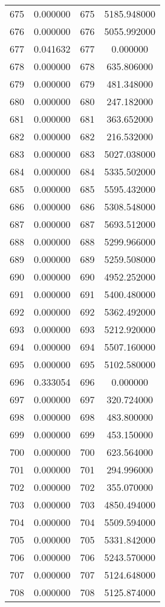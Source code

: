 \documentclass[12pt]{article}
\begin{document}
\begin{longtable}{@{}cccc@{}}
675 & 0.000000 & 675 & 5185.948000 \\
676 & 0.000000 & 676 & 5055.992000 \\
677 & 0.041632 & 677 & 0.000000 \\
678 & 0.000000 & 678 & 635.806000 \\
679 & 0.000000 & 679 & 481.348000 \\
680 & 0.000000 & 680 & 247.182000 \\
681 & 0.000000 & 681 & 363.652000 \\
682 & 0.000000 & 682 & 216.532000 \\
683 & 0.000000 & 683 & 5027.038000 \\
684 & 0.000000 & 684 & 5335.502000 \\
685 & 0.000000 & 685 & 5595.432000 \\
686 & 0.000000 & 686 & 5308.548000 \\
687 & 0.000000 & 687 & 5693.512000 \\
688 & 0.000000 & 688 & 5299.966000 \\
689 & 0.000000 & 689 & 5259.508000 \\
690 & 0.000000 & 690 & 4952.252000 \\
691 & 0.000000 & 691 & 5400.480000 \\
692 & 0.000000 & 692 & 5362.492000 \\
693 & 0.000000 & 693 & 5212.920000 \\
694 & 0.000000 & 694 & 5507.160000 \\
695 & 0.000000 & 695 & 5102.580000 \\
696 & 0.333054 & 696 & 0.000000 \\
697 & 0.000000 & 697 & 320.724000 \\
698 & 0.000000 & 698 & 483.800000 \\
699 & 0.000000 & 699 & 453.150000 \\
700 & 0.000000 & 700 & 623.564000 \\
701 & 0.000000 & 701 & 294.996000 \\
702 & 0.000000 & 702 & 355.070000 \\
703 & 0.000000 & 703 & 4850.494000 \\
704 & 0.000000 & 704 & 5509.594000 \\
705 & 0.000000 & 705 & 5331.842000 \\
706 & 0.000000 & 706 & 5243.570000 \\
707 & 0.000000 & 707 & 5124.648000 \\
708 & 0.000000 & 708 & 5125.874000 \\

\end{longtable}
\end{document}
